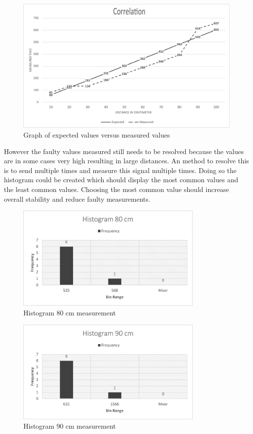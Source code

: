 \documentclass[10pt,a4paper]{article}
\begin{document}
\begin{figure}[H]
   \centering
   \includegraphics[width=\textwidth]{grafiekcorrelation.pdf}
   \caption{Graph of expected values versus measured values}
   \label{fig:grafiekcorrelation}
\end{figure}

However the faulty values measured still needs to be resolved because the values are in some cases very high resulting in large distances. An method to resolve this is to send multiple times and measure this signal multiple times. Doing so the histogram could be created which should display the most common values and the least common values. Choosing the most common value should increase overall stability and reduce faulty measurements.

\begin{figure}[H]
   \centering
   \includegraphics[width=0.82\textwidth]{histogram80.pdf}
   \caption{Histogram 80 cm measurement}
   \label{fig:histrogram80}
\end{figure}

\begin{figure}[H]
   \centering
   \includegraphics[width=0.82\textwidth]{histogram90.pdf}
   \caption{Histogram 90 cm measurement}
   \label{fig:histrogram90}
\end{figure}
\end{document}
